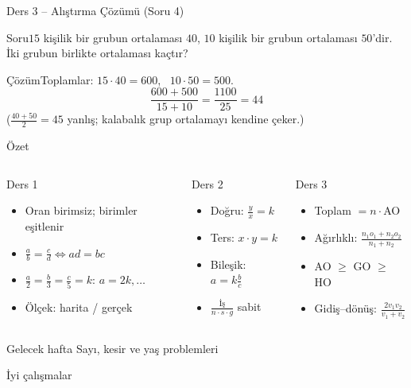 \documentclass[aspectratio=169,11pt,handout]{beamer}
\newcommand{\soru}[3]{%
\begin{frame}{#1}
  \begin{block}{Soru}\large #2\end{block}
  \pause
  \begin{exampleblock}{Çözüm}\large #3\end{exampleblock}
\end{frame}}
\begin{document}
\soru{Ders 3 -- Alıştırma Çözümü (Soru 4)}
{\(15\) kişilik bir grubun ortalaması \(40\), \(10\) kişilik bir grubun ortalaması \(50\)'dir. İki grubun birlikte ortalaması kaçtır?}
{Toplamlar: \(15\cdot 40=600\), \ \(10\cdot 50=500\).
\[\frac{600+500}{15+10}=\frac{1100}{25}=44\]
(\(\frac{40+50}{2}=45\) yanlış; kalabalık grup ortalamayı kendine çeker.)}


\begin{frame}{Özet}
\begin{columns}[t]
\begin{block}{Ders 1}
\begin{itemize}
\item Oran birimsiz; birimler eşitlenir
\item \(\frac{a}{b}=\frac{c}{d}\Leftrightarrow ad=bc\)
\item \(\frac{a}{2}=\frac{b}{3}=\frac{c}{5}=k\): \(a=2k,\dots\)
\item Ölçek: harita / gerçek
\end{itemize}
\end{block}
\begin{block}{Ders 2}
\begin{itemize}
\item Doğru: \(\frac{y}{x}=k\)
\item Ters: \(x\cdot y=k\)
\item Bileşik: \(a=k\frac{b}{c}\)
\item \(\frac{\text{İş}}{n\cdot s\cdot g}\) sabit
\end{itemize}
\end{block}
\begin{block}{Ders 3}
\begin{itemize}
\item Toplam \(=n\cdot\)AO
\item Ağırlıklı: \(\frac{n_1o_1+n_2o_2}{n_1+n_2}\)
\item AO \(\ge\) GO \(\ge\) HO
\item Gidiş--dönüş: \(\frac{2v_1v_2}{v_1+v_2}\)
\end{itemize}
\end{block}
\end{columns}
\vspace{6pt}
\begin{alertblock}{Gelecek hafta}
Sayı, kesir ve yaş problemleri
\end{alertblock}
\end{frame}

\begin{frame}
\centering\Large İyi çalışmalar
\end{frame}
\end{document}
